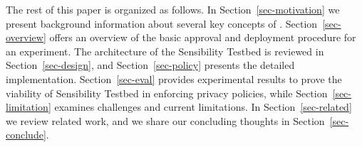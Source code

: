 The rest of this paper is organized as follows. In Section~\ref{sec-motivation} we
present background information about several key concepts of \sysname. 
Section~\ref{sec-overview} offers an overview of the basic approval and 
deployment procedure for an experiment. 
The architecture of the Sensibility Testbed 
is reviewed in Section~\ref{sec-design}, and Section~\ref{sec-policy} 
presents the detailed implementation. 
Section~\ref{sec-eval} provides experimental results to prove the
viability of Sensibility Testbed in enforcing privacy policies, while
Section~\ref{sec-limitation} examines challenges and current limitations. 
In Section~\ref{sec-related} we review related work,
and we share our concluding thoughts in Section~\ref{sec-conclude}.

